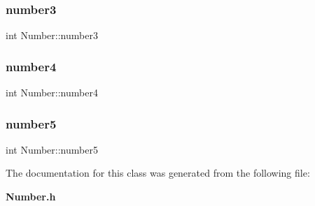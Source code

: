 \subsubsection{number3}
{\footnotesize\ttfamily int Number\+::number3\hspace{0.3cm}{\ttfamily [protected]}}

\mbox{\label{class_number_af1d284ff109b3c9c7f185e6c068f2228}} 
\subsubsection{number4}
{\footnotesize\ttfamily int Number\+::number4\hspace{0.3cm}{\ttfamily [protected]}}

\mbox{\label{class_number_a0b6325b956c7926186be8bfa3d8c5212}} 
\subsubsection{number5}
{\footnotesize\ttfamily int Number\+::number5\hspace{0.3cm}{\ttfamily [protected]}}



The documentation for this class was generated from the following file\+:\begin{DoxyCompactItemize}
\item 
\textbf{ Number.\+h}\end{DoxyCompactItemize}
